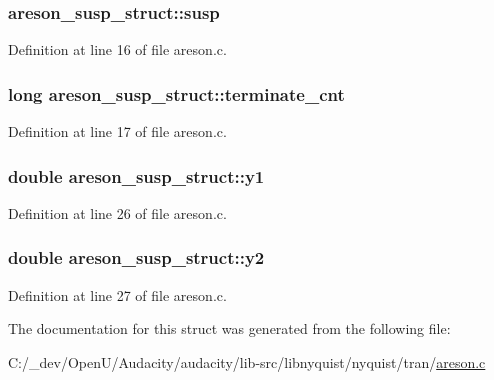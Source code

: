 \subsubsection[{\texorpdfstring{susp}{susp}}]{ areson\+\_\+susp\+\_\+struct\+::susp}\hypertarget{structareson__susp__struct_a2c8bf2bcf7097ba80429306e52cac98a}{}\label{structareson__susp__struct_a2c8bf2bcf7097ba80429306e52cac98a}


Definition at line 16 of file areson.\+c.

\subsubsection[{\texorpdfstring{terminate\+\_\+cnt}{terminate_cnt}}]{\setlength{\rightskip}{0pt plus 5cm}long areson\+\_\+susp\+\_\+struct\+::terminate\+\_\+cnt}\hypertarget{structareson__susp__struct_a5c9856d4a7067080cb5e35be89194a49}{}\label{structareson__susp__struct_a5c9856d4a7067080cb5e35be89194a49}


Definition at line 17 of file areson.\+c.

\subsubsection[{\texorpdfstring{y1}{y1}}]{\setlength{\rightskip}{0pt plus 5cm}double areson\+\_\+susp\+\_\+struct\+::y1}\hypertarget{structareson__susp__struct_a4cb469c687aabfb50fc4299537094cb6}{}\label{structareson__susp__struct_a4cb469c687aabfb50fc4299537094cb6}


Definition at line 26 of file areson.\+c.

\subsubsection[{\texorpdfstring{y2}{y2}}]{\setlength{\rightskip}{0pt plus 5cm}double areson\+\_\+susp\+\_\+struct\+::y2}\hypertarget{structareson__susp__struct_acd0279e0d58da9bd053bba443aada3ba}{}\label{structareson__susp__struct_acd0279e0d58da9bd053bba443aada3ba}


Definition at line 27 of file areson.\+c.



The documentation for this struct was generated from the following file\+:\begin{DoxyCompactItemize}
\item 
C\+:/\+\_\+dev/\+Open\+U/\+Audacity/audacity/lib-\/src/libnyquist/nyquist/tran/\hyperlink{areson_8c}{areson.\+c}\end{DoxyCompactItemize}
